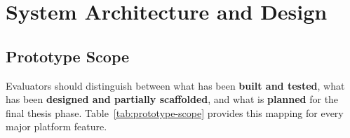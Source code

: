 \documentclass[12pt,a4paper]{report}
\begin{document}
\chapter{System Architecture and Design}

\section{Prototype Scope}
\label{sec:prototype-scope}

Evaluators should distinguish between what has been \textbf{built and tested}, what has been \textbf{designed and partially scaffolded}, and what is \textbf{planned} for the final thesis phase. Table~\ref{tab:prototype-scope} provides this mapping for every major platform feature.
\end{document}
